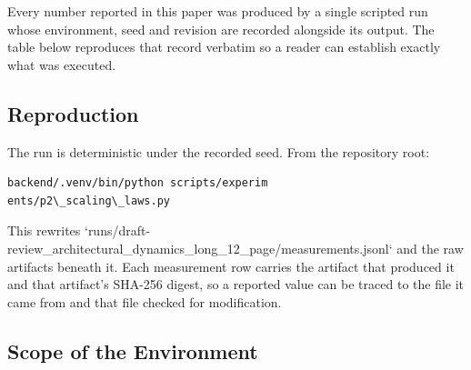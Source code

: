 \documentclass[10pt,twocolumn,letterpaper]{article}
\begin{document}
Every number reported in this paper was produced by a single scripted run whose environment, seed and revision are recorded alongside its output. The table below reproduces that record verbatim so a reader can establish exactly what was executed.
\begin{table}[htbp]
\centering
{}
\end{table}


\subsection{Reproduction}


The run is deterministic under the recorded seed. From the repository root:


\begin{scriptsize}
\begin{verbatim}
backend/.venv/bin/python scripts/experim
ents/p2\_scaling\_laws.py
\end{verbatim}
\end{scriptsize}


This rewrites `runs/draft-review\_architectural\_dynamics\_long\_12\_page/measurements.jsonl` and the raw artifacts beneath it. Each measurement row carries the artifact that produced it and that artifact's SHA-256 digest, so a reported value can be traced to the file it came from and that file checked for modification.


\subsection{Scope of the Environment}
\end{document}
